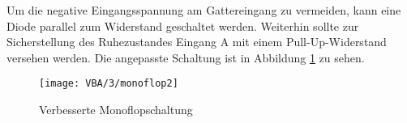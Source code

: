 Um die negative Eingangsspannung am Gattereingang zu vermeiden, kann eine Diode
parallel zum Widerstand geschaltet werden. Weiterhin sollte zur Sicherstellung
des Ruhezustandes Eingang A mit einem Pull-Up-Widerstand versehen werden. Die
angepasste Schaltung ist in Abbildung \ref{fig:monoflop3} zu sehen.

\begin{figure}[]
  \begin{center}
    \texttt{[image: VBA/3/monoflop2]}
  \end{center}
  \caption{Verbesserte Monoflopschaltung}
  \label{fig:monoflop3}
\end{figure}
